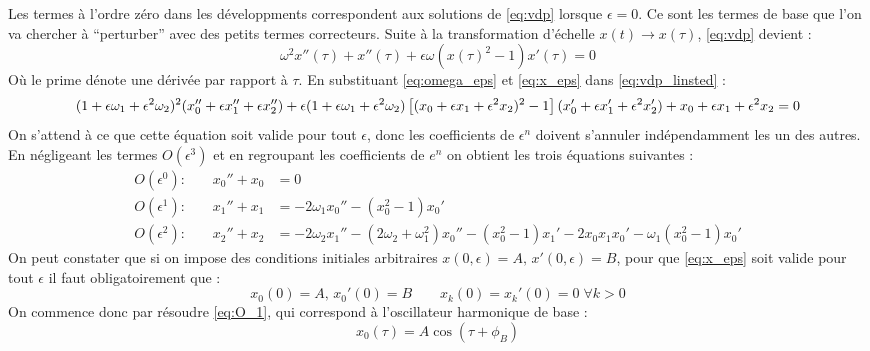 %
Les termes à l’ordre zéro dans les développments correspondent aux solutions de \eqref{eq:vdp} lorsque $\epsilon = 0$.
Ce sont les termes de base que l’on va chercher à ``perturber” avec des petits termes correcteurs.
%
Suite à la transformation d'échelle $x(t) \to x(\tau)$, \eqref{eq:vdp} devient :
%
\begin{equation}
    \omega^2x''(\tau) + x''(\tau) + \epsilon\omega \left( x(\tau)^2 - 1 \right)x'(\tau) = 0
    \label{eq:vdp_linsted}
\end{equation}
%
Où le prime dénote une dérivée par rapport à $\tau$. En substituant \eqref{eq:omega_eps} et \eqref{eq:x_eps} dans \eqref{eq:vdp_linsted} :
%
\begin{dmath}
    (1+\epsilon\omega_1 + \epsilon^2\omega_2)^2(x_0'' + \epsilon x_1'' + \epsilon x_2'') + \epsilon(1+\epsilon\omega_1 + \epsilon^2\omega_2)\left[(x_0 + \epsilon x_1 + \epsilon^2 x_2)^2-1\right](x_0' + \epsilon x_1' + \epsilon^2 x_2') \\
    + {x_0 + \epsilon x_1 + \epsilon^2 x_2} = 0
\end{dmath}
%
On s’attend à ce que cette  équation soit valide pour tout $\epsilon$, donc les coefficients de $\epsilon^n$ doivent s’annuler indépendamment les un des autres. 
En négligeant les termes $O(\epsilon^3)$ et en regroupant les coefficients de $e^n$ on obtient les trois équations suivantes :
%
\begin{align}
    \label{eq:O_1}
    O(\epsilon^0)\text{:}\qquad      x_0'' + x_0 &= 0  \\
    \label{eq:O_eps}
    O(\epsilon^1)\text{:}\qquad      x_1'' + x_1 &= -2\omega_1 x_0'' - (x_0^2 - 1)x_0' \\
    \label{eq:O_eps2}
    O(\epsilon^2)\text{:}\qquad      x_2'' + x_2 &= -2\omega_2 x_1'' - (2\omega_2 + \omega_1^2)x_0'' - (x_0^2 - 1)x_1' - 2x_0 x_1 x_0' - \omega_1(x_0^2 - 1)x_0'
\end{align}
%
%
On peut constater que si on impose des conditions initiales arbitraires $x(0, \epsilon)=A,  \, x'(0, \epsilon)=B$, pour que \eqref{eq:x_eps} 
soit valide pour tout $\epsilon$ il faut obligatoirement que :
%
\begin{equation}
    x_0(0) = A,\, x_0'(0) = B
    \qquad
    x_k(0) = x_k'(0) = 0 \; \forall k > 0
\end{equation}
%
On commence donc par résoudre \eqref{eq:O_1}, qui correspond à l'oscillateur harmonique de base :
%
\begin{equation}
    x_0(\tau) = A \cos(\tau + \phi_B)
\end{equation}
